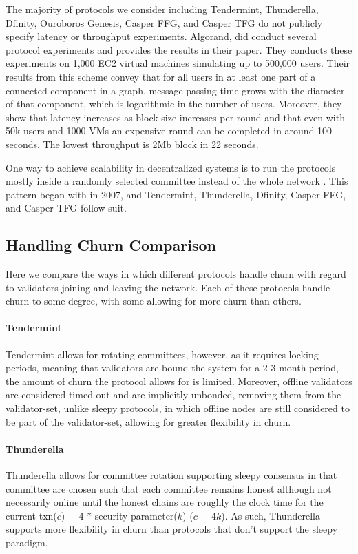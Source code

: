 \documentclass[10pt,journal,compsoc]{IEEEtran}
\begin{document}
The majority of protocols we consider including Tendermint, Thunderella, Dfinity, Ouroboros Genesis, Casper FFG, and Casper TFG do not publicly specify latency or throughput experiments. Algorand, did conduct several protocol experiments and provides the results in their paper. They conducts these experiments on 1,000 EC2 virtual machines simulating up to 500,000 users. Their results from this scheme convey that for all users in at least one part of a connected component in a graph, message passing time grows with the diameter of that component, which is logarithmic in the number of users. Moreover, they show that latency increases as block size increases per round and that even with 50k users and 1000 VMs an expensive round can be completed in around 100 seconds. The lowest throughput is 2Mb block in 22 seconds.  
 
One way to achieve scalability in decentralized systems is to run the protocols mostly inside a randomly selected committee instead of the whole network \cite{KapronEtAl}. This pattern began with \cite{KingEtAl} in 2007, and Tendermint, Thunderella, Dfinity, Casper FFG, and Casper TFG follow suit.

\subsection{Handling Churn Comparison}
Here we compare the ways in which different protocols handle churn with regard to validators joining and leaving the network. Each of these protocols handle churn to some degree, with some allowing for more churn than others. 

\paragraph{Tendermint} Tendermint allows for rotating committees, however, as it requires locking periods, meaning that validators are bound the system for a 2-3 month period, the amount of churn the protocol allows for is limited. Moreover, offline validators are considered timed out and are implicitly unbonded, removing them from the validator-set, unlike sleepy protocols, in which offline nodes are still considered to be part of the validator-set, allowing for greater flexibility in churn. \cite{Sleepy}

\paragraph{Thunderella} Thunderella allows for committee rotation supporting sleepy consensus in that committee are chosen such that each committee remains honest although not necessarily online until the honest chains are roughly the clock time for the current txn($c$) + 4 * security parameter($k$) ($c$ + 4$k$). As such, Thunderella supports more flexibility in churn than protocols that don't support the sleepy paradigm. 
  
\end{document}
